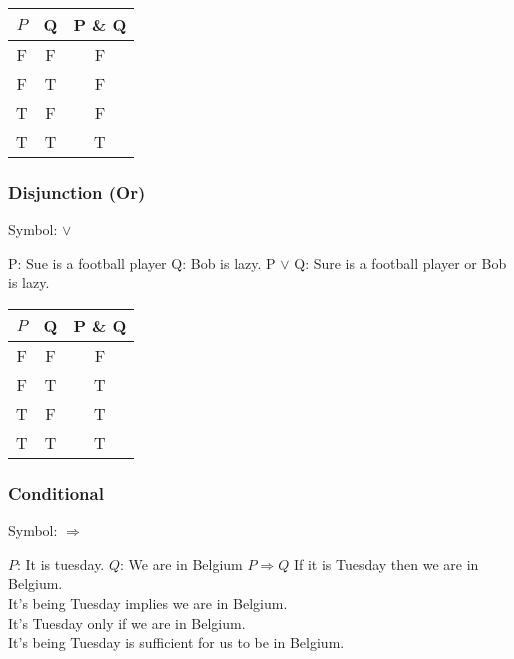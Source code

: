 \documentclass[11pt, oneside]{article}   	%
\begin{document}
\begin{table}[htbp]
   \centering
   \begin{tabular}{@{} cc|c @{}} %
      $P$ & Q & P \& Q\\
      \midrule
      F & F & F\\
      F & T & F\\
      T & F & F\\
      T & T & T\\
   \end{tabular}
   \label{tab:booktabs}
\end{table}

\subsubsection{Disjunction (Or)}
Symbol: $\vee$

P: Sue is a football player
Q: Bob is lazy.
P $\vee$ Q: Sure is a football player or Bob is lazy.

\begin{table}[htbp]
   \centering
   \begin{tabular}{@{} cc|c @{}} %
      $P$ & Q & P \& Q\\
      \midrule
      F & F & F\\
      F & T & T\\
      T & F & T\\
      T & T & T\\
   \end{tabular}
   \label{tab:booktabs}
\end{table}

\subsubsection{Conditional}
Symbol: $\Rightarrow$

$P$: It is tuesday.
$Q$: We are in Belgium
$P\Rightarrow Q$
If it is Tuesday then we are in Belgium.\\
It's being Tuesday implies we are in Belgium.\\
It's Tuesday only if we are in Belgium.\\
It's being Tuesday is sufficient for us to be in Belgium.\\
\end{document}
